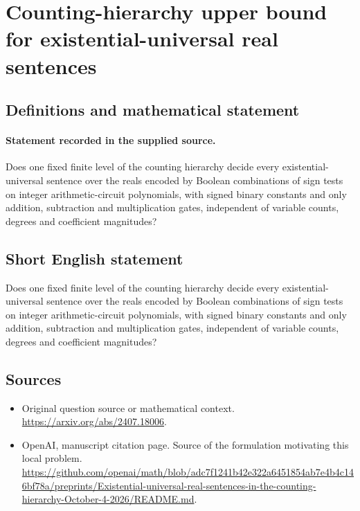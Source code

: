 \documentclass[11pt]{article}
\begin{document}
\section*{Counting-hierarchy upper bound for existential-universal real sentences}\label{30007454}
\subsection{Definitions and mathematical statement}
\paragraph{Statement recorded in the supplied source.}
Does one fixed finite level of the counting hierarchy decide every existential-universal sentence over the reals encoded by Boolean combinations of sign tests on integer arithmetic-circuit polynomials, with signed binary constants and only addition, subtraction and multiplication gates, independent of variable counts, degrees and coefficient magnitudes?
\subsection{Short English statement}
Does one fixed finite level of the counting hierarchy decide every existential-universal sentence over the reals encoded by Boolean combinations of sign tests on integer arithmetic-circuit polynomials, with signed binary constants and only addition, subtraction and multiplication gates, independent of variable counts, degrees and coefficient magnitudes?
\subsection{Sources}
\begin{itemize}
\item[S1] Original question source or mathematical context.
\url{https://arxiv.org/abs/2407.18006}.
\item[S2] OpenAI, manuscript citation page. Source of the formulation motivating this local problem.
\url{https://github.com/openai/math/blob/adc7f1241b42e322a6451854ab7e4b4c146bf78a/preprints/Existential-universal-real-sentences-in-the-counting-hierarchy-October-4-2026/README.md}.
\end{itemize}
\end{document}
